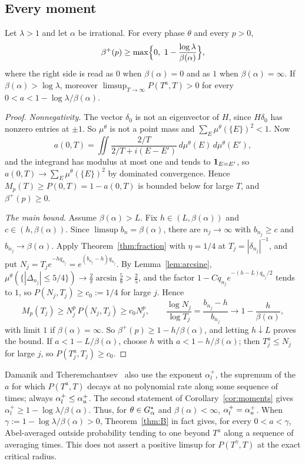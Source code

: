 \begin{remark}
\end{remark}

\subsection{Every moment}\label{sec:everymoment}

\begin{corollary}\label{cor:moments}
Let $\lambda>1$ and let $\alpha$ be irrational. For every phase $\theta$ and every $p>0$,
\[
\beta^+(p)\ge\max\Bigl\{0,\ 1-\frac{\log\lambda}{\beta(\alpha)}\Bigr\},
\]
where the right side is read as $0$ when $\beta(\alpha)=0$ and as $1$ when $\beta(\alpha)=\infty$. If $\beta(\alpha)>\log\lambda$, moreover $\limsup_{T\to\infty}P(T^a,T)>0$ for every $0<a<1-\log\lambda/\beta(\alpha)$.
\end{corollary}

\begin{proof}
\emph{Nonnegativity.} The vector $\delta_0$ is not an eigenvector of $H$, since $H\delta_0$ has nonzero entries at $\pm1$. So $\mu^\theta$ is not a point mass and $\sum_E\mu^\theta(\{E\})^2<1$. Now
\[
a(0,T)=\iint\frac{2/T}{2/T+i(E-E')}\,d\mu^\theta(E)\,d\mu^\theta(E'),
\]
and the integrand has modulus at most one and tends to $\mathbf 1_{E=E'}$, so $a(0,T)\to\sum_E\mu^\theta(\{E\})^2$ by dominated convergence. Hence $M_p(T)\ge P(0,T)=1-a(0,T)$ is bounded below for large $T$, and $\beta^+(p)\ge0$.

\emph{The main bound.} Assume $\beta(\alpha)>L$. Fix $h\in(L,\beta(\alpha))$ and $c\in(h,\beta(\alpha))$. Since $\limsup b_n=\beta(\alpha)$, there are $n_j\to\infty$ with $b_{n_j}\ge c$ and $b_{n_j}\to\beta(\alpha)$. Apply Theorem~\ref{thm:fraction} with $\eta=1/4$ at $T_j=|\delta_{n_j}|^{-1}$, and put $N_j=T_je^{-hq_{n_j}}=e^{(b_{n_j}-h)q_{n_j}}$. By Lemma~\ref{lem:arcsine}, $\mu^\theta(\{|\Delta_{n_j}|\le5/4\})\to\frac2\pi\arcsin\frac58>\frac25$, and the factor $1-Cq_{n_j}e^{-(h-L)q_{n_j}/2}$ tends to $1$, so $P(N_j,T_j)\ge c_0:=1/4$ for large $j$. Hence
\[
M_p(T_j)\ge N_j^p\,P(N_j,T_j)\ge c_0N_j^p,\qquad\frac{\log N_j}{\log T_j}=\frac{b_{n_j}-h}{b_{n_j}}\to1-\frac h{\beta(\alpha)},
\]
with limit $1$ if $\beta(\alpha)=\infty$. So $\beta^+(p)\ge1-h/\beta(\alpha)$, and letting $h\downarrow L$ proves the bound. If $a<1-L/\beta(\alpha)$, choose $h$ with $a<1-h/\beta(\alpha)$; then $T_j^a\le N_j$ for large $j$, so $P(T_j^a,T_j)\ge c_0$.
\end{proof}

Damanik and Tcheremchantsev~\cite{DT2007} also use the exponent $\alpha_l^+$, the supremum of the $a$ for which $P(T^a,T)$ decays at no polynomial rate along some sequence of times; always $\alpha_l^+\le\alpha_u^+$. The second statement of Corollary~\ref{cor:moments} gives $\alpha_l^+\ge1-\log\lambda/\beta(\alpha)$. Thus, for $\theta\in G_\alpha^*$ and $\beta(\alpha)<\infty$, $\alpha_l^+=\alpha_u^+$. When $\gamma:=1-\log\lambda/\beta(\alpha)>0$, Theorem~\ref{thm:B} in fact gives, for every $0<a<\gamma$, Abel-averaged outside probability tending to one beyond $T^a$ along a sequence of averaging times. This does not assert a positive limsup for $P(T^\gamma,T)$ at the exact critical radius.

